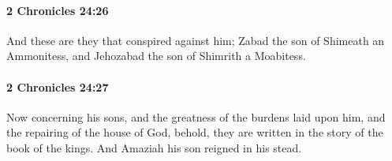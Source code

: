 		\paragraph{2 Chronicles 24:26} %
			\label{2CHRONICLES-24-26}

			And these are they that conspired against him; Zabad the son of Shimeath an Ammonitess, and Jehozabad the son of Shimrith a Moabitess.


		\paragraph{2 Chronicles 24:27} %
			\label{2CHRONICLES-24-27}

			Now concerning his sons, and the greatness of the burdens laid upon him, and the repairing of the house of God, behold, they are written in the story of the book of the kings. And Amaziah his son reigned in his stead.

